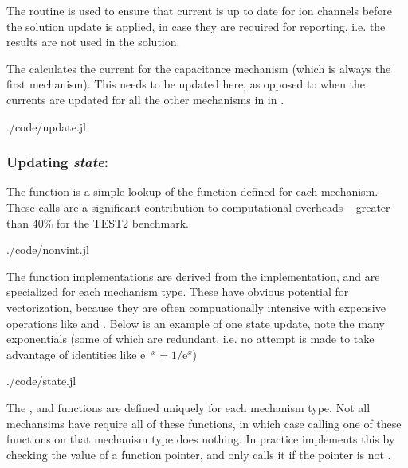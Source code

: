 The  routine is used to ensure that current is up to date for ion channels before the solution update is applied, in case they are required for reporting, i.e. the results are not used in the solution.

The  calculates the current for the capacitance mechanism (which is always the first mechanism). This needs to be updated here, as opposed to when the currents are updated for all the other mechanisms in  in .

\begin{shaded}
 {./code/update.jl}
\end{shaded}
\subsubsection{Updating \emph{state}: }
The  function is a simple lookup of the  function defined for each mechanism. These calls are a significant contribution to computational overheads -- greater than 40\% for the TEST2 benchmark.

\begin{shaded}
 {./code/nonvint.jl}
\end{shaded}

The  function implementations are derived from the \hoc implementation, and are specialized for each mechanism type. These have obvious potential for vectorization, because they are often compuationally intensive with expensive operations like  and . Below is an example of one state update, note the many exponentials (some of which are redundant, i.e. no attempt is made to take advantage of identities like $\text{e}^{-x}=1/\text{e}^{x}$)

\begin{shaded}
 {./code/state.jl}
\end{shaded}

\begin{note}
    The ,  and  functions are defined uniquely for each mechanism type. Not all mechansims have require all of these functions, in which case calling one of these functions on that mechanism type does nothing. In practice \neuron implements this by checking the value of a function pointer, and only calls it if the pointer is not .
\end{note}
